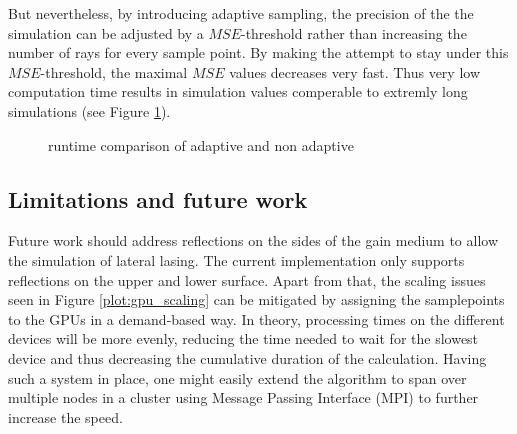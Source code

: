 But nevertheless, by introducing adaptive sampling, the precision of the the simulation
can be adjusted by a $MSE$-threshold rather than increasing the number
of rays for every sample point. By making the attempt to stay under this $MSE$-threshold,
the maximal $MSE$ values decreases very fast. Thus very low computation time results in
simulation values comperable to extremly long simulations (see Figure \ref{plot:adaptive_runtime}).
\begin{figure}[H]
  \centerline{
    }
  \caption{runtime comparison of adaptive and non adaptive }
  \label{plot:adaptive_runtime}
\end{figure}

\subsection{Limitations and future work}
\label{subsec:limitations}
Future work should address reflections on the sides of the gain medium to allow the
simulation of lateral lasing. The current implementation only supports
reflections on the upper and lower surface.
Apart from that, the scaling issues seen in Figure \ref{plot:gpu_scaling} can be
mitigated by assigning the samplepoints to the GPUs in a demand-based way.  In
theory, processing times on the different devices will be more evenly, reducing
the time needed to wait for the slowest device and thus decreasing the
cumulative duration of the calculation. Having such a system in place, one might
easily extend the algorithm to span over multiple nodes in a cluster using
Message Passing Interface (MPI)\cite{MPI} to further increase the speed.
